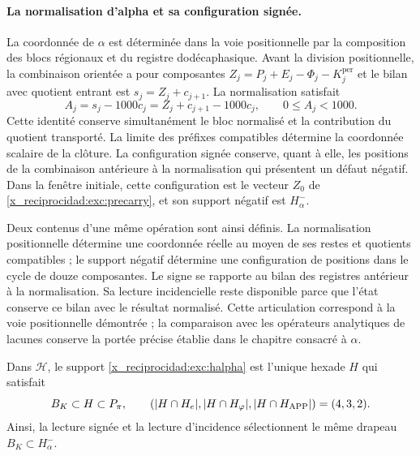 \paragraph{La normalisation d'alpha et sa configuration signée.}
\label{x_reciprocidad:inc-ampl-clausura}
La coordonnée de $\alpha$ est déterminée dans la voie positionnelle par la composition des blocs régionaux et du registre dodécaphasique. Avant la division positionnelle, la combinaison orientée a pour composantes $Z_j=P_j+E_j-\Phi_j-K_j^{\mathrm{per}}$ et le bilan avec quotient entrant est $s_j=Z_j+c_{j+1}$. La normalisation satisfait
\begin{equation}
 A_j=s_j-1000c_j=Z_j+c_{j+1}-1000c_j,\qquad 0\leq A_j<1000.
 \label{x_reciprocidad:inc-ampl-normalizacion}
\end{equation}
Cette identité conserve simultanément le bloc normalisé et la
contribution du quotient transporté. La limite des préfixes
compatibles détermine la coordonnée scalaire de la clôture. La
configuration signée conserve, quant à elle, les positions de la
combinaison antérieure à la normalisation qui présentent un défaut négatif.
Dans la fenêtre initiale, cette configuration est le vecteur $Z_0$ de
\eqref{x_reciprocidad:exc:precarry}, et son support négatif est $H^-_\alpha$.

Deux contenus d'une même opération sont ainsi définis. La
normalisation positionnelle détermine une coordonnée réelle au moyen de ses
restes et quotients compatibles ; le support négatif détermine une
configuration de positions dans le cycle de douze composantes. Le signe
se rapporte au bilan des registres antérieur à la normalisation. Sa lecture
incidencielle reste disponible parce que l'état conserve ce bilan
avec le résultat normalisé. Cette articulation correspond à la
voie positionnelle démontrée ; la comparaison avec les opérateurs analytiques
de lacunes conserve la portée précise établie dans le chapitre
consacré à $\alpha$.



\begin{proposition}
\label{x_reciprocidad:exc:selector-bandera}
Dans $\mathcal H$, le support \eqref{x_reciprocidad:exc:halpha} est l'unique hexade $H$ qui satisfait
\[
 B_K\subset H\subset P_\pi,
 \qquad
 (|H\cap H_e|,|H\cap H_\varphi|,|H\cap H_{\rm APP}|)=(4,3,2).
\]
Ainsi, la lecture signée et la lecture d'incidence sélectionnent le même
drapeau $B_K\subset H^-_\alpha$.
\end{proposition}

